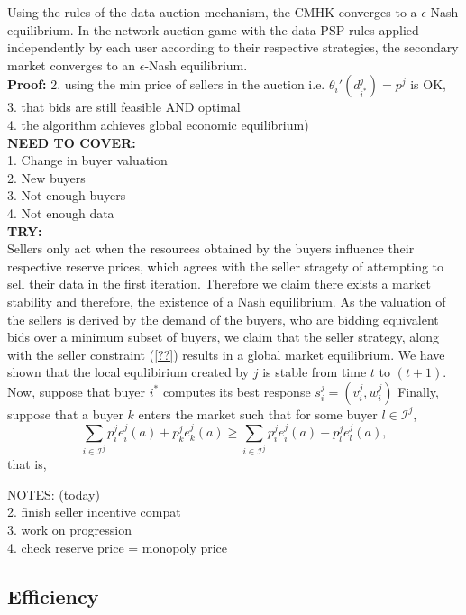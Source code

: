 \documentclass[12pt]{article}
\theoremstyle{definition}
\newcommand{\mcI}{\mathcal{I}}
\begin{document}
\begin{multicols}{2}
{
}

{
Using the rules of the data auction mechanism, the CMHK
\cite{zheng} converges to a $\epsilon$-Nash equilibrium. In the network auction
game with the data-PSP rules applied independently by each user according to their respective strategies, the secondary market converges to an $\epsilon$-Nash
equilibrium. 
}\\
\textbf{Proof:}
2. using the min price of sellers in the auction i.e. ${\theta_i}'(d_{i^*}^j) =
p^j$ is OK, \\
3. that bids are still feasible AND optimal \\
4. the algorithm achieves global economic equilibrium)\\
\textbf{NEED TO COVER:}\\
1. Change in buyer valuation \\
2. New buyers\\
3. Not enough buyers \\
4. Not enough data\\
\textbf{TRY:}\\
Sellers only act when the resources obtained by the buyers influence their
respective reserve prices, which agrees with the seller stragety of attempting
to sell their data in the first iteration. Therefore we claim there exists a
market stability and therefore, the existence of a Nash equilibrium. As the
valuation of the sellers is derived by the demand of the buyers, who are
bidding equivalent bids over a minimum subset of buyers, we claim that the seller
strategy, along with the seller constraint (\ref{??}) results in a global
market equilibrium.
We have shown that the local
equlibirium created by $j$ is stable from time $t$ to $(t+1)$. 
Now, suppose that buyer $i^*$ computes its best response $s_i^j = (v_i^j, w_i^j)$
Finally, suppose that
a buyer $k$ enters the market such that for some buyer $l\in\mcI^j$,
$$
    \displaystyle\sum_{i\in\mcI^j} p_i^je_i^j(a) + p_k^je_k^j(a) \ge
\sum_{i\in\mcI^j} p_i^je_i^j(a) - p_l^je_l^j(a),
$$
that is,



NOTES: (today)\\
2. finish seller incentive compat\\
3. work on progression\\
4. check reserve price = monopoly price


\subsection{Efficiency}


\end{multicols}
\end{document}
